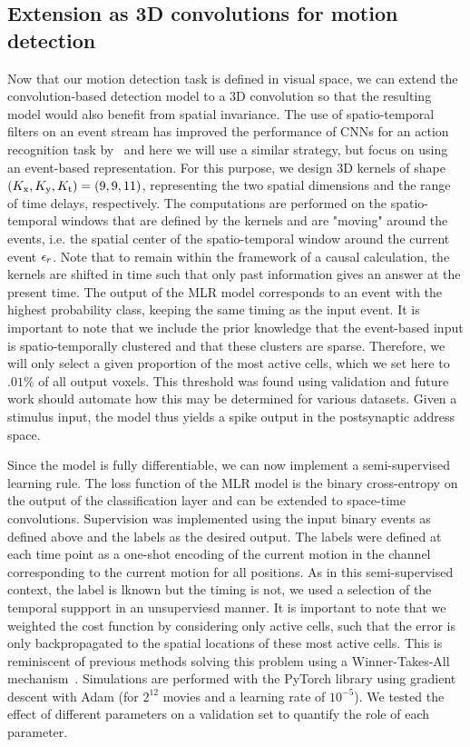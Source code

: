 \documentclass[default]{sn-jnl}%
\theoremstyle{thmstyleone}%
\theoremstyle{thmstyletwo}%
\theoremstyle{thmstylethree}%
\begin{document}
\subsection{Extension as 3D convolutions for motion detection}
%
Now that our motion detection task is defined in visual space, we can extend the convolution-based detection model to a 3D convolution so that the resulting model would also benefit from spatial invariance. The use of spatio-temporal filters on an event stream has improved the performance of CNNs for an action recognition task by~\citet{ghosh_spatio-temporal_2019} and here we will use a similar strategy, but focus on using an event-based representation.
For this purpose, we design 3D kernels of shape $(K_\text{x}, K_\text{y}, K_\text{t}) = (9, 9, 11)$, representing the two spatial dimensions and the range of time delays, respectively.
The computations are performed on the spatio-temporal windows that are defined by the kernels and are "moving" around the events, i.e. the spatial center of the spatio-temporal window around the current event $\epsilon_r$. Note that to remain within the framework of a causal calculation, the kernels are shifted in time such that only past information gives an answer at the present time.
%
The output of the MLR model corresponds to an event with the highest probability class, keeping the same timing as the input event. It is important to note that we include the prior knowledge that the event-based input is spatio-temporally clustered and that these clusters are sparse. Therefore, we will only select a given proportion of the most active cells, which we set here to $.01\%$ of all output voxels. This threshold was found using validation and future work should automate how this may be determined for various datasets. Given a stimulus input, the model thus yields a spike output in the postsynaptic address space.

%
Since the model is fully differentiable, we can now implement a semi-supervised learning rule. The loss function of the MLR model is the binary cross-entropy on the output of the classification layer and can be extended to space-time convolutions. Supervision was implemented using the input binary events as defined above and the labels as the desired output. The labels were defined at each time point as a one-shot encoding of the current motion in the channel corresponding to the current motion for all positions. As in this semi-supervised context, the label is lknown but the timing is not, we used a selection of the temporal suppport in an unsuperviesd manner. It is important to note that we weighted the cost function by considering only active cells, such that the error is only backpropagated to the spatial locations of these most active cells. This is reminiscent of previous methods solving this problem using a Winner-Takes-All mechanism~\citep{masquelier2007}. Simulations are performed with the PyTorch library using gradient descent with Adam (for $2^{12}$ movies and a learning rate of $10^{-5}$). We tested the effect of different parameters on a validation set to quantify the role of each parameter.
\end{document}
